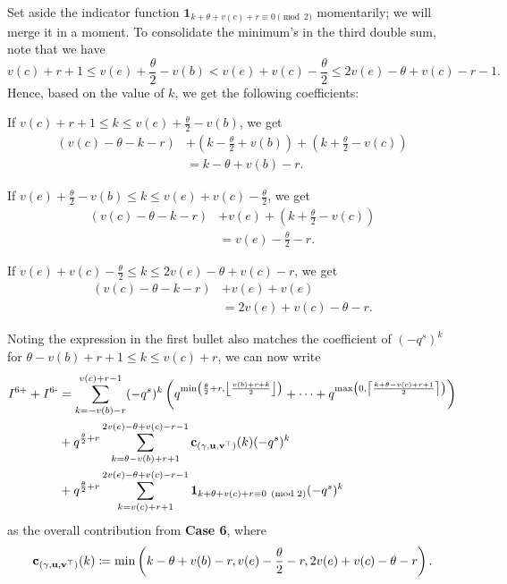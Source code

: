 Set aside the indicator function
$\mathbf{1}_{k + \theta + v(c) + r \equiv 0 \pmod 2}$ momentarily;
we will merge it in a moment.
To consolidate the minimum's in the third double sum,
note that we have
\[ v(c) + r + 1 \le v(e) + \frac{\theta}{2} - v(b)
< v(e) + v(c) - \frac{\theta}{2} \le 2v(e) - \theta + v(c) - r - 1. \]
Hence, based on the value of $k$, we get the following coefficients:
\begin{itemize}
  \ii If $v(c) + r + 1 \le k \le v(e) + \frac{\theta}{2} - v(b)$, we get
  \begin{align*}
    \left( v(c) - \theta - k - r \right)
    &+ \left( k - \frac{\theta}{2} + v(b) \right)
    + \left( k + \frac{\theta}{2} - v(c) \right)  \\
    &= k - \theta + v(b) - r.
  \end{align*}

  \ii If $v(e) + \frac{\theta}{2} - v(b) \le k \le v(e) + v(c) - \frac{\theta}{2}$, we get
  \begin{align*}
    \left( v(c) - \theta - k - r \right)
    &+ v(e)
    + \left( k + \frac{\theta}{2} - v(c) \right)  \\
    &= v(e) - \frac{\theta}{2} - r.
  \end{align*}

  \ii If $v(e) + v(c) - \frac{\theta}{2} \le k \le 2v(e) - \theta + v(c) - r$, we get
  \begin{align*}
    \left( v(c) - \theta - k - r \right)
    &+ v(e) + v(e) \\
    &= 2v(e) + v(c) - \theta - r.
  \end{align*}
\end{itemize}
Noting the expression in the first bullet also matches the coefficient of $(-q^s)^k$
for $\theta - v(b) + r + 1 \le k \le v(c) + r$, we can now write
\begin{align*}
  I^{\text{6+}} + I^{\text{6-}}
  &=
  \sum_{k = - v(b) - r}^{v(c) + r - 1} (-q^s)^k \left(
    q^{\min\left( \frac{\theta}{2} + r, \left\lfloor \frac{v(b) + r + k}{2} \right\rfloor \right)}
    + \dots
    + q^{\max\left(0, \left\lceil \frac{k + \theta - v(c) + r + 1}{2} \right\rceil \right)}
    \right) \\
  &+ q^{\frac{\theta}{2} + r}
  \sum_{k = \theta - v(b) + r + 1}^{2v(e) - \theta + v(c) - r - 1} \mathbf c_{(\gamma, \mathbf u, \mathbf v^\top)}(k)(-q^s)^k \\
  &+ q^{\frac{\theta}{2} + r}
  \sum_{k = v(c) + r + 1}^{2v(e) - \theta + v(c) - r - 1}
  \mathbf{1}_{k + \theta + v(c) + r \equiv 0 \pmod 2} (-q^s)^k
\end{align*}
as the overall contribution from \textbf{Case 6}, where
\[ \mathbf c_{(\gamma, \mathbf u, \mathbf v^\top)}(k) \coloneqq \min \left( k - \theta + v(b) - r,
  v(e) - \frac{\theta}{2} - r,
  2v(e) + v(c) - \theta - r \right). \]

